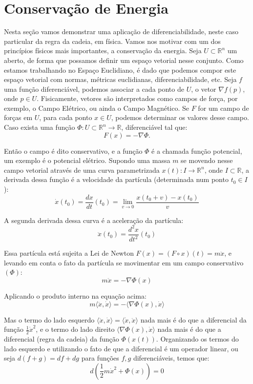 \appendix \section{Conservação de Energia}

\hspace{0.5cm}
Nesta seção vamos demonstrar uma aplicação de diferenciabilidade, 
neste caso particular da regra da cadeia, em física. Vamos nos motivar com um dos princípios físicos mais importantes, a conservação da energia. Seja $U \subset \mathbb{R}^n$ um aberto, de forma que possamos definir um espaço vetorial nesse conjunto. Como estamos trabalhando no Espaço Euclidiano, é dado que podemos compor este espaço vetorial com normas, métricas euclidianas, diferenciabilidade, etc. Seja $f$ uma função diferenciável, podemos associar a cada ponto de $U$, o vetor $\nabla f (p)$, onde $p\in U$. Fisicamente, vetores são interpretados como campos de força, por exemplo, o Campo Elétrico, ou ainda o Campo Magnético. Se $F$ for um campo de forças em $U$, para cada ponto $x \in U$, podemos determinar os valores desse campo. Caso exista uma função $\Phi:U\subset\mathbb{R}^n\to\mathbb{R}$, diferenciável tal que: 
%
\begin{equation}
F(x) = - \nabla \Phi.
\end{equation}

Então o campo é dito conservativo, e a função $\Phi$ é a chamada 
função potencial, um exemplo é o potencial elétrico. Supondo uma 
massa $m$ se movendo nesse campo vetorial através de uma curva 
parametrizada $x(t): I \to \mathbb{R}^n$, onde $I \subset \mathbb{R}$, a derivada dessa função é a velocidade da partícula (determinada num ponto $t_0 \in I$):
%
\[
\dot{x}(t_0) = \frac{dx}{dt}(t_0) 
= \lim_{v \to 0}\frac{x(t_0 + v) - x(t_0)}{v}
\]

A segunda derivada dessa curva é a aceleração da partícula:
%
\[
\ddot{x}(t_0) = \frac{d^2x}{dt^2}(t_0)
\]

Essa partícula está sujeita a Lei de Newton 
$F(x) = (F\circ x)(t) = m\ddot{x}$, e levando em conta o fato 
da partícula se movimentar em um campo conservativo $(\Phi)$:
%
\[
m \ddot{x} = - \nabla \Phi(x)
\]

Aplicando o produto interno na equação acima:
%
\[
m \langle\ddot{x},\dot{x}\rangle 
= - \langle \nabla \Phi(x),\dot{x}\rangle 
\]

Mas o termo do lado esquerdo $\langle\ddot{x},\dot{x}\rangle = \langle\dot{x},\ddot{x}\rangle$ nada mais é do que a diferencial da função $\frac{1}{2}\dot{x}^2$, e o termo do lado direito $\langle \nabla \Phi(x),\dot{x}\rangle$ nada mais é do que a diferencial (regra da cadeia) da função $\Phi(x(t))$. Organizando os termos do lado esquerdo e utilizando o fato de que a diferencial é um operador linear, ou seja $d(f + g) = df + dg$ para funções $f,g$ diferenciáveis, temos que:
%
\[
d\left(\frac{1}{2}m\dot{x}^2 + \Phi(x) \right) = 0
\]

